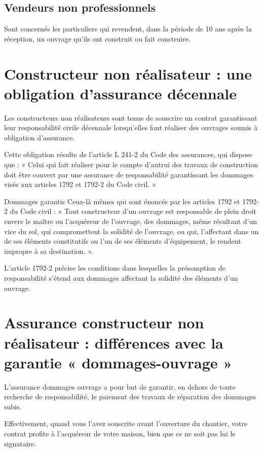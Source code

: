   \subsection{Vendeurs non professionnels}

    Sont concernés les particuliers qui revendent, dans la période de 10 ans après la réception, un ouvrage qu'ils ont construit ou fait construire.

\section{Constructeur non réalisateur : une obligation d'assurance décennale}

  Les constructeurs non réalisateurs sont tenus de souscrire un contrat garantissant leur responsabilité civile décennale lorsqu'elles font réaliser des ouvrages soumis à obligation d'assurance.

  Cette obligation résulte de l'article L 241-2 du Code des assurances, qui dispose que : « Celui qui fait réaliser pour le compte d'autrui des travaux de construction doit être couvert par une assurance de responsabilité garantissant les dommages visés aux articles 1792 et 1792-2 du Code civil. »

  Dommages garantis
  Ceux-là mêmes qui sont énoncés par les articles 1792 et 1792-2 du Code civil : « Tout constructeur d'un ouvrage est responsable de plein droit envers le maître ou l'acquéreur de l'ouvrage, des dommages, même résultant d'un vice du sol, qui compromettent la solidité de l'ouvrage, ou qui, l'affectant dans un de ses éléments constitutifs ou l'un de ses éléments d'équipement, le rendent impropre à sa destination. ».

  L'article 1792-2 précise les conditions dans lesquelles la présomption de responsabilité s'étend aux dommages affectant la solidité des éléments d'un ouvrage.

  \section{Assurance constructeur non réalisateur : différences avec la garantie « dommages-ouvrage »}

L'assurance dommages ouvrage a pour but de garantir, en dehors de toute recherche de responsabilité, le paiement des travaux de réparation des dommages subis.

Effectivement, quand vous l'avez souscrite avant l'ouverture du chantier, votre contrat profite à l'acquéreur de votre maison, bien que ce ne soit pas lui le signataire.

